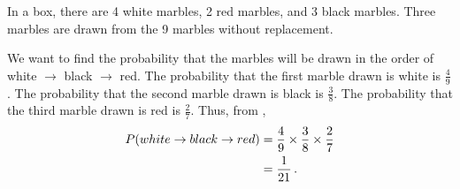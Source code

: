 \begin{subquestions}

\subquestion

In a box, there are 4 white marbles, 2 red marbles, and 3 black marbles. Three marbles are drawn from the 9 marbles without replacement.  

\begin{subsubquestions}
	
\subsubquestion

We want to find the probability that the marbles will be drawn in the order of white $\rightarrow$ black $\rightarrow$ red. The probability that the first marble drawn is white is $\frac{4}{9}$. The probability that the second marble drawn is black is $\frac{3}{8}$. The probability that the third marble drawn is red is $\frac{2}{7}$. Thus, from , 
\begin{align}
	P(white \rightarrow black \rightarrow red) & = \frac{4}{9} \times \frac{3}{8} \times \frac{2}{7} \nonumber \\
	                                           & = \frac{1}{21} \,.
\end{align}
	
\subsubquestion


\end{subsubquestions}





\end{subquestions}